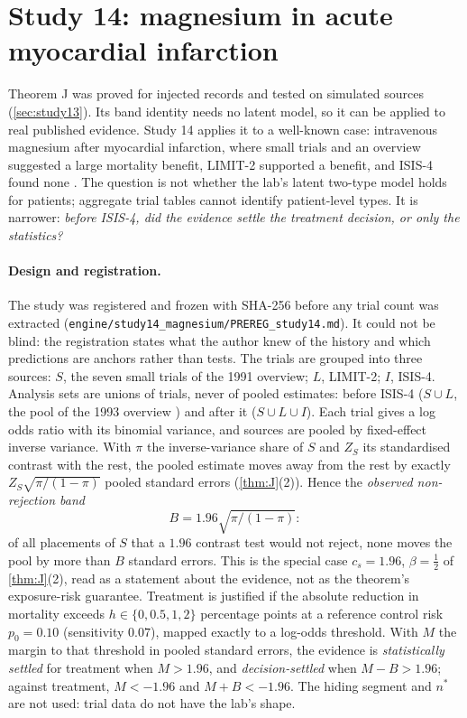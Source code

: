 \section{Study 14: magnesium in acute myocardial infarction}\label{sec:study14}
Theorem J was proved for injected records and tested on simulated sources (\cref{sec:study13}). Its band identity needs no latent
model, so it can be applied to real published evidence. Study 14 applies it to a well-known case: intravenous magnesium after
myocardial infarction, where small trials and an overview \cite{Teo1991} suggested a large mortality benefit, LIMIT-2 \cite{Woods1992}
supported a benefit, and ISIS-4 \cite{ISIS41995} found none \cite{EggerDaveySmith1995}. The question is not whether the
lab's latent two-type model holds for patients; aggregate trial tables cannot identify patient-level types. It is narrower:
\emph{before ISIS-4, did the evidence settle the treatment decision, or only the statistics?}

\paragraph{Design and registration.} The study was registered and frozen with SHA-256 before any trial count was extracted
(\texttt{engine/\allowbreak study14\_magnesium/\allowbreak PREREG\_study14.md}). It could not be blind: the registration states what
the author knew of the history and which predictions are anchors rather than tests. The trials are grouped into three sources: $S$, the
seven small trials of the 1991 overview; $L$, LIMIT-2; $I$, ISIS-4. Analysis sets are unions of trials, never of pooled estimates:
before ISIS-4 ($S\cup L$, the pool of the 1993 overview \cite{YusufTeoWoods1993}) and after it ($S\cup L\cup I$). Each trial gives a log
odds ratio with its binomial variance, and sources are pooled by fixed-effect inverse variance. With $\pi$ the inverse-variance
share of $S$ and $Z_S$ its standardised contrast with the rest, the pooled estimate moves away from the rest by exactly
$Z_S\sqrt{\pi/(1-\pi)}$ pooled standard errors (\cref{thm:J}(2)). Hence the \emph{observed non-rejection band}
\[
B=1.96\sqrt{\pi/(1-\pi)} :
\]
of all placements of $S$ that a $1.96$ contrast test would not reject, none moves the pool by more than $B$ standard errors. This is the
special case $c_s=1.96$, $\beta=\tfrac12$ of \cref{thm:J}(2), read as a statement about the evidence, not as the theorem's
exposure-risk guarantee. Treatment is justified if the absolute reduction in mortality exceeds $h\in\{0,0.5,1,2\}$ percentage points at a
reference control risk $p_0=0.10$ (sensitivity $0.07$), mapped exactly to a log-odds threshold. With $M$ the margin to that threshold in
pooled standard errors, the evidence is \emph{statistically settled} for treatment when $M>1.96$, and \emph{decision-settled} when
$M-B>1.96$; against treatment, $M<-1.96$ and $M+B<-1.96$. The hiding segment and $n^*$ are not used: trial data do not have the lab's
shape.

